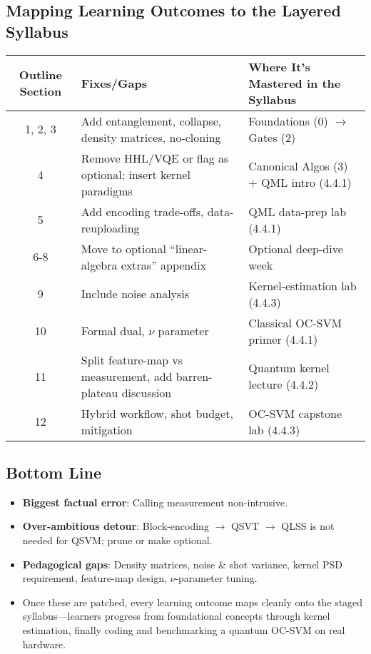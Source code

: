 \documentclass[11pt,a4paper]{article}
\begin{document}
	\subsection{Mapping Learning Outcomes to the Layered Syllabus}
	\begin{longtable}{|c|l|l|}
		\hline
		\textbf{Outline Section} & \textbf{Fixes/Gaps} & \textbf{Where It’s Mastered in the Syllabus} \\
		\hline
		1, 2, 3 & Add entanglement, collapse, density matrices, no-cloning & Foundations (0) $\rightarrow$ Gates (2) \\
		\hline
		4 & Remove HHL/VQE or flag as optional; insert kernel paradigms & Canonical Algos (3) + QML intro (4.4.1) \\
		\hline
		5 & Add encoding trade-offs, data-reuploading & QML data-prep lab (4.4.1) \\
		\hline
		6-8 & Move to optional “linear-algebra extras” appendix & Optional deep-dive week \\
		\hline
		9 & Include noise analysis & Kernel-estimation lab (4.4.3) \\
		\hline
		10 & Formal dual, $\nu$ parameter & Classical OC-SVM primer (4.4.1) \\
		\hline
		11 & Split feature-map vs measurement, add barren-plateau discussion & Quantum kernel lecture (4.4.2) \\
		\hline
		12 & Hybrid workflow, shot budget, mitigation & OC-SVM capstone lab (4.4.3) \\
		\hline
	\end{longtable}
	
	\subsection{Bottom Line}
	\begin{itemize}
		\item \textbf{Biggest factual error}: Calling measurement non-intrusive.
		\item \textbf{Over-ambitious detour}: Block-encoding $\rightarrow$ QSVT $\rightarrow$ QLSS is not needed for QSVM; prune or make optional.
		\item \textbf{Pedagogical gaps}: Density matrices, noise \& shot variance, kernel PSD requirement, feature-map design, $\nu$-parameter tuning.
		\item Once these are patched, every learning outcome maps cleanly onto the staged syllabus—learners progress from foundational concepts through kernel estimation, finally coding and benchmarking a quantum OC-SVM on real hardware.
	\end{itemize}
\end{document}
